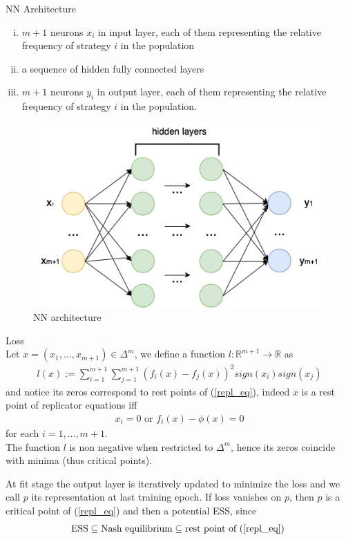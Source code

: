 \documentclass[12pt,a4paper,twoside]{article}
\theoremstyle{plain}
\theoremstyle{definition}
\theoremstyle{remark}
\begin{document}
\begin{paragraph}{NN Architecture}
\begin{enumerate}[i)]
\item  $m+1$ neurons $x_i$ in input layer, each of them representing the relative frequency of strategy $i$ in the population
\item a sequence of hidden fully connected layers
\item  $m+1$ neurons $y_i$ in output layer, each of them representing the relative frequency of strategy $i$ in the population.
\end{enumerate}

\begin{figure}[h]
\centering
\includegraphics[scale=0.6]{figures/feedforward_nn_architecture.png}
\caption{NN architecture}
\label{nn_arch}
\end{figure} 
\end{paragraph}

\begin{paragraph}{Loss} \ \\
Let $x =(x_1, \ldots, x_{m+1}) \in \Delta^m$, we define a function $l: \mathbb{R}^{m+1} \rightarrow \mathbb{R}$ as 
\begin{align}
l(x) := \sum_{i=1}^{m+1} \sum_{j=1}^{m+1} (f_i(x) -f_j(x))^2 sign(x_i) sign(x_j)  
\end{align}
and notice its zeros correspond to rest points of (\ref{repl_eq}), indeed $x$ is a rest point of replicator equations iff
\begin{align*}
x_i = 0 \textrm{ or } f_{i}(x)-\phi (x) = 0
\end{align*}
for each $i = 1,\ldots, m+1$.\\
The function $l$ is non negative when restricted to $\Delta^m$, hence its zeros coincide with minima (thus critical points).
\end{paragraph}
At fit stage the output layer is iteratively updated to minimize the loss and we call $p$ its representation at last training epoch. If loss vanishes on $p$, then $p$ is a critical point of (\ref{repl_eq}) and then a potential ESS, since 
\begin{align*}
\textrm{ESS}  \subseteq \textrm{Nash equilibrium} \subseteq  \textrm{rest point of (\ref{repl_eq}) } 
\end{align*}
\end{document}
